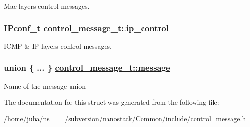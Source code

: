 Mac-layers control messages. \hypertarget{structcontrol__message__t_a7fedb2fdb523167bdbcc1a1fbde5576}{
\subsubsection[ip\_\-control]{\setlength{\rightskip}{0pt plus 5cm}\hyperlink{structIPconf__t}{IPconf\_\-t} \hyperlink{structcontrol__message__t_a7fedb2fdb523167bdbcc1a1fbde5576}{control\_\-message\_\-t::ip\_\-control}}}
\label{structcontrol__message__t_a7fedb2fdb523167bdbcc1a1fbde5576}


ICMP \& IP layers control messages. \hypertarget{structcontrol__message__t_75a5f0af56a265cf8491405c290fef02}{
\subsubsection[message]{\setlength{\rightskip}{0pt plus 5cm}union \{ ... \}  \hyperlink{structcontrol__message__t_75a5f0af56a265cf8491405c290fef02}{control\_\-message\_\-t::message}}}
\label{structcontrol__message__t_75a5f0af56a265cf8491405c290fef02}


Name of the message union 

The documentation for this struct was generated from the following file:\begin{CompactItemize}
\item 
/home/juha/ns\_\_\_/subversion/nanostack/Common/include/\hyperlink{control__message_8h}{control\_\-message.h}\end{CompactItemize}
